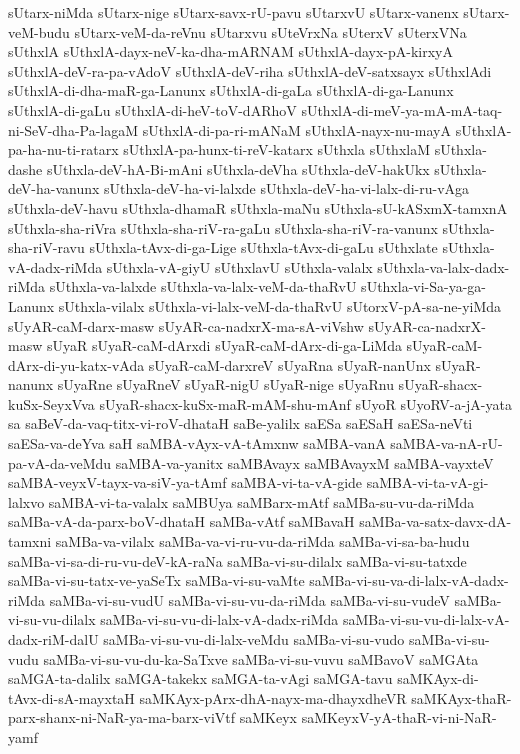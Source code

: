 {sUtarx-niMda
sUtarx-nige
sUtarx-savx-rU-pavu
sUtarxvU
sUtarx-vanenx
sUtarx-veM-budu
sUtarx-veM-da-reVnu
sUtarxvu
sUteVrxNa
sUterxV
sUterxVNa
sUthxlA
sUthxlA-dayx-neV-ka-dha-mARNAM
sUthxlA-dayx-pA-kirxyA
sUthxlA-deV-ra-pa-vAdoV
sUthxlA-deV-riha
sUthxlA-deV-satxsayx
sUthxlAdi
sUthxlA-di-dha-maR-ga-Lanunx
sUthxlA-di-gaLa
sUthxlA-di-ga-Lanunx
sUthxlA-di-gaLu
sUthxlA-di-heV-toV-dARhoV
sUthxlA-di-meV-ya-mA-mA-taq-ni-SeV-dha-Pa-lagaM
sUthxlA-di-pa-ri-mANaM
sUthxlA-nayx-nu-mayA
sUthxlA-pa-ha-nu-ti-ratarx
sUthxlA-pa-hunx-ti-reV-katarx
sUthxla
sUthxlaM
sUthxla-dashe
sUthxla-deV-hA-Bi-mAni
sUthxla-deVha
sUthxla-deV-hakUkx
sUthxla-deV-ha-vanunx
sUthxla-deV-ha-vi-lalxde
sUthxla-deV-ha-vi-lalx-di-ru-vAga
sUthxla-deV-havu
sUthxla-dhamaR
sUthxla-maNu
sUthxla-sU-kASxmX-tamxnA
sUthxla-sha-riVra
sUthxla-sha-riV-ra-gaLu
sUthxla-sha-riV-ra-vanunx
sUthxla-sha-riV-ravu
sUthxla-tAvx-di-ga-Lige
sUthxla-tAvx-di-gaLu
sUthxlate
sUthxla-vA-dadx-riMda
sUthxla-vA-giyU
sUthxlavU
sUthxla-valalx
sUthxla-va-lalx-dadx-riMda
sUthxla-va-lalxde
sUthxla-va-lalx-veM-da-thaRvU
sUthxla-vi-Sa-ya-ga-Lanunx
sUthxla-vilalx
sUthxla-vi-lalx-veM-da-thaRvU
sUtorxV-pA-sa-ne-yiMda
sUyAR-caM-darx-masw
sUyAR-ca-nadxrX-ma-sA-viVshw
sUyAR-ca-nadxrX-masw
sUyaR
sUyaR-caM-dArxdi
sUyaR-caM-dArx-di-ga-LiMda
sUyaR-caM-dArx-di-yu-katx-vAda
sUyaR-caM-darxreV
sUyaRna
sUyaR-nanUnx
sUyaR-nanunx
sUyaRne
sUyaRneV
sUyaR-nigU
sUyaR-nige
sUyaRnu
sUyaR-shacx-kuSx-SeyxVva
sUyaR-shacx-kuSx-maR-mAM-shu-mAnf
sUyoR
sUyoRV-a-jA-yata
sa
saBeV-da-vaq-titx-vi-roV-dhataH
saBe-yalilx
saESa
saESaH
saESa-neVti
saESa-va-deYva
saH
saMBA-vAyx-vA-tAmxnw
saMBA-vanA
saMBA-va-nA-rU-pa-vA-da-veMdu
saMBA-va-yanitx
saMBAvayx
saMBAvayxM
saMBA-vayxteV
saMBA-veyxV-tayx-va-siV-ya-tAmf
saMBA-vi-ta-vA-gide
saMBA-vi-ta-vA-gi-lalxvo
saMBA-vi-ta-valalx
saMBUya
saMBarx-mAtf
saMBa-su-vu-da-riMda
saMBa-vA-da-parx-boV-dhataH
saMBa-vAtf
saMBavaH
saMBa-va-satx-davx-dA-tamxni
saMBa-va-vilalx
saMBa-va-vi-ru-vu-da-riMda
saMBa-vi-sa-ba-hudu
saMBa-vi-sa-di-ru-vu-deV-kA-raNa
saMBa-vi-su-dilalx
saMBa-vi-su-tatxde
saMBa-vi-su-tatx-ve-yaSeTx
saMBa-vi-su-vaMte
saMBa-vi-su-va-di-lalx-vA-dadx-riMda
saMBa-vi-su-vudU
saMBa-vi-su-vu-da-riMda
saMBa-vi-su-vudeV
saMBa-vi-su-vu-dilalx
saMBa-vi-su-vu-di-lalx-vA-dadx-riMda
saMBa-vi-su-vu-di-lalx-vA-dadx-riM-dalU
saMBa-vi-su-vu-di-lalx-veMdu
saMBa-vi-su-vudo
saMBa-vi-su-vudu
saMBa-vi-su-vu-du-ka-SaTxve
saMBa-vi-su-vuvu
saMBavoV
saMGAta
saMGA-ta-dalilx
saMGA-takekx
saMGA-ta-vAgi
saMGA-tavu
saMKAyx-di-tAvx-di-sA-mayxtaH
saMKAyx-pArx-dhA-nayx-ma-dhayxdheVR
saMKAyx-thaR-parx-shanx-ni-NaR-ya-ma-barx-viVtf
saMKeyx
saMKeyxV-yA-thaR-vi-ni-NaR-yamf
}
